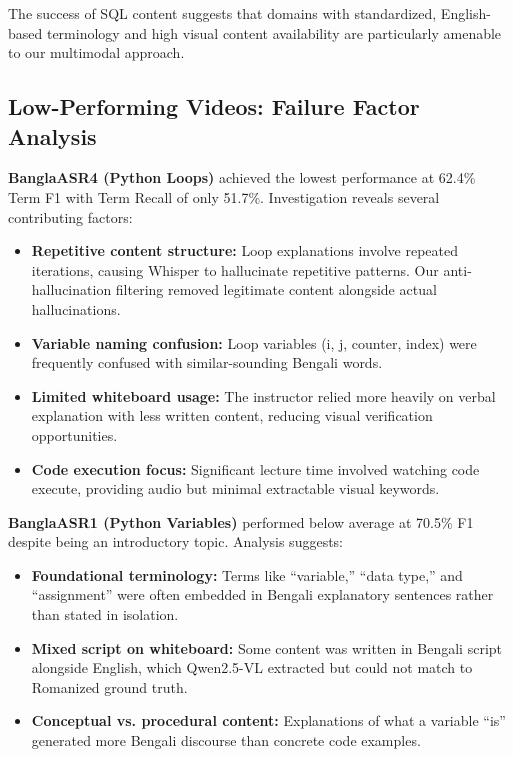 The success of SQL content suggests that domains with standardized, English-based terminology and high visual content availability are particularly amenable to our multimodal approach.

\subsection{Low-Performing Videos: Failure Factor Analysis}

\textbf{BanglaASR4 (Python Loops)} achieved the lowest performance at 62.4\% Term F1 with Term Recall of only 51.7\%. Investigation reveals several contributing factors:

\begin{itemize}
    \item \textbf{Repetitive content structure:} Loop explanations involve repeated iterations, causing Whisper to hallucinate repetitive patterns. Our anti-hallucination filtering removed legitimate content alongside actual hallucinations.
    \item \textbf{Variable naming confusion:} Loop variables (i, j, counter, index) were frequently confused with similar-sounding Bengali words.
    \item \textbf{Limited whiteboard usage:} The instructor relied more heavily on verbal explanation with less written content, reducing visual verification opportunities.
    \item \textbf{Code execution focus:} Significant lecture time involved watching code execute, providing audio but minimal extractable visual keywords.
\end{itemize}

\textbf{BanglaASR1 (Python Variables)} performed below average at 70.5\% F1 despite being an introductory topic. Analysis suggests:

\begin{itemize}
    \item \textbf{Foundational terminology:} Terms like ``variable,'' ``data type,'' and ``assignment'' were often embedded in Bengali explanatory sentences rather than stated in isolation.
    \item \textbf{Mixed script on whiteboard:} Some content was written in Bengali script alongside English, which Qwen2.5-VL extracted but could not match to Romanized ground truth.
    \item \textbf{Conceptual vs. procedural content:} Explanations of what a variable ``is'' generated more Bengali discourse than concrete code examples.
\end{itemize}

